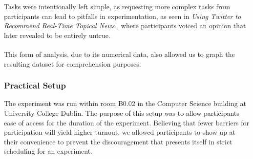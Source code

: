 \documentclass{article}
\begin{document}
Tasks were intentionally left simple, as requesting more complex tasks from participants can lead to pitfalls in experimentation, as seen in \textit{Using Twitter to Recommend Real-Time Topical News} \cite{paper3}, where participants voiced an opinion that later revealed to be entirely untrue.
\\\\
This form of analysis, due to its numerical data, also allowed us to graph the resulting dataset for comprehension purposes. 

\subsubsection*{Practical Setup} %
%
%
The experiment was run within room B0.02 in the Computer Science building at University College Dublin. The purpose of this setup was to allow participants ease of access for the duration of the experiment. Believing that fewer barriers for participation will yield higher turnout, we allowed participants to show up at their convenience to prevent the discouragement that presents itself in strict scheduling for an experiment. 

\end{document}
